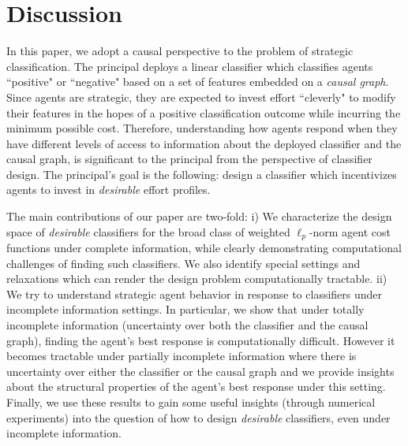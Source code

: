 \section{Discussion}\label{sec:discussion}
In this paper, we adopt a causal perspective to the problem of strategic classification. The principal deploys a linear classifier which classifies agents ``positive" or ``negative" based on a set of features embedded on a \textit{causal graph}. Since agents are strategic, they are expected to invest effort ``cleverly" to modify their features in the hopes of a positive classification outcome while incurring the minimum possible cost. 
Therefore, understanding how agents respond when they have different levels of access to information about the deployed classifier and the causal graph, is significant to the principal from the perspective of classifier design. The principal's goal is the following: design a classifier which incentivizes agents to invest in \textit{desirable} effort profiles. 

The main contributions of our paper are two-fold: i) We characterize the design space of \textit{desirable} classifiers for the broad class of weighted $\ell_p$-norm agent cost functions under complete information, while clearly demonstrating computational challenges of finding such classifiers. We also identify special settings and relaxations which can render the design problem computationally tractable. ii) We try to understand strategic agent behavior in response to classifiers under incomplete information settings. In particular, we show that under totally incomplete information (uncertainty over both the classifier and the causal graph), finding the agent's best response is computationally difficult. However it becomes tractable under partially incomplete information where there is uncertainty over either the classifier or the causal graph and we provide insights about the structural properties of the agent's best response under this setting. Finally, we use these results to gain some useful insights (through numerical experiments) into the question of how to design \textit{desirable} classifiers, even under incomplete information. 

